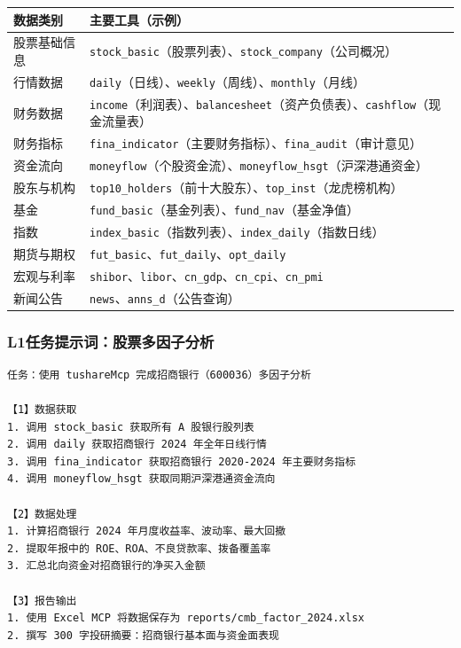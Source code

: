 \begin{table}[H]
\centering
\small
\begin{tabular}{lp{10cm}}
\toprule
\textbf{数据类别} & \textbf{主要工具（示例）} \\
\midrule
股票基础信息 & \texttt{stock\_basic}（股票列表）、\texttt{stock\_company}（公司概况） \\
行情数据 & \texttt{daily}（日线）、\texttt{weekly}（周线）、\texttt{monthly}（月线） \\
财务数据 & \texttt{income}（利润表）、\texttt{balancesheet}（资产负债表）、\texttt{cashflow}（现金流量表） \\
财务指标 & \texttt{fina\_indicator}（主要财务指标）、\texttt{fina\_audit}（审计意见） \\
资金流向 & \texttt{moneyflow}（个股资金流）、\texttt{moneyflow\_hsgt}（沪深港通资金） \\
股东与机构 & \texttt{top10\_holders}（前十大股东）、\texttt{top\_inst}（龙虎榜机构） \\
基金 & \texttt{fund\_basic}（基金列表）、\texttt{fund\_nav}（基金净值） \\
指数 & \texttt{index\_basic}（指数列表）、\texttt{index\_daily}（指数日线） \\
期货与期权 & \texttt{fut\_basic}、\texttt{fut\_daily}、\texttt{opt\_daily} \\
宏观与利率 & \texttt{shibor}、\texttt{libor}、\texttt{cn\_gdp}、\texttt{cn\_cpi}、\texttt{cn\_pmi} \\
新闻公告 & \texttt{news}、\texttt{anns\_d}（公告查询） \\
\bottomrule
\end{tabular}
\end{table}

\subsubsection{L1任务提示词：股票多因子分析}

\begin{lstlisting}
任务：使用 tushareMcp 完成招商银行（600036）多因子分析

【1】数据获取
1. 调用 stock_basic 获取所有 A 股银行股列表
2. 调用 daily 获取招商银行 2024 年全年日线行情
3. 调用 fina_indicator 获取招商银行 2020-2024 年主要财务指标
4. 调用 moneyflow_hsgt 获取同期沪深港通资金流向

【2】数据处理
1. 计算招商银行 2024 年月度收益率、波动率、最大回撤
2. 提取年报中的 ROE、ROA、不良贷款率、拨备覆盖率
3. 汇总北向资金对招商银行的净买入金额

【3】报告输出
1. 使用 Excel MCP 将数据保存为 reports/cmb_factor_2024.xlsx
2. 撰写 300 字投研摘要：招商银行基本面与资金面表现
\end{lstlisting}

